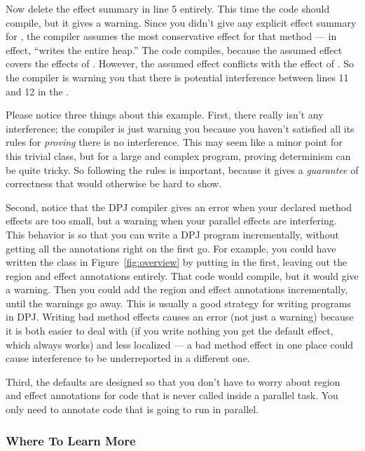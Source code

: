 Now delete the effect summary in line 5 entirely.  This time the
code should compile, but it gives a warning.  Since you didn't give
any explicit effect summary for , the compiler assumes the
most conservative effect for that method --- in effect, ``writes the
entire heap.''  The code compiles, because the assumed effect
covers the effects of .  However, the assumed effect
conflicts with the effect  of .  So the
compiler is warning you that there is potential interference between
lines 11 and 12 in the .

Please notice three things about this example.  First, there really
isn't any interference; the compiler is just warning you because you
haven't satisfied all its rules for \emph{proving} there is no
interference.  This may seem like a minor point for this trivial
class, but for a large and complex program, proving determinism can be
quite tricky.  So following the rules is important, because it gives a
\emph{guarantee} of correctness that would otherwise be hard to show.

Second, notice that the DPJ compiler gives an error when your declared
method effects are too small, but a warning when your parallel effects
are interfering.  This behavior is so that you can write a DPJ program
incrementally, without getting all the annotations right on the first
go.  For example, you could have written the class in
Figure~\ref{fig:overview} by putting in the  first,
leaving out the region and effect annotations entirely.  That code
would compile, but it would give a warning.  Then you could add the
region and effect annotations incrementally, until the warnings go
away.  This is usually a good strategy for writing programs in DPJ.
Writing bad method effects causes an error (not just a warning)
because it is both easier to deal with (if you write nothing you get
the default effect, which always works) and less localized --- a bad
method effect in one place could cause interference to be
underreported in a different one.

Third, the defaults are designed so that you don't have to worry about
region and effect annotations for code that is never called inside a
parallel task.  You only need to annotate code that is going to run in
parallel.

\subsubsection{Where To Learn More%
\label{sec:overview:basic:where-tolearn}}

